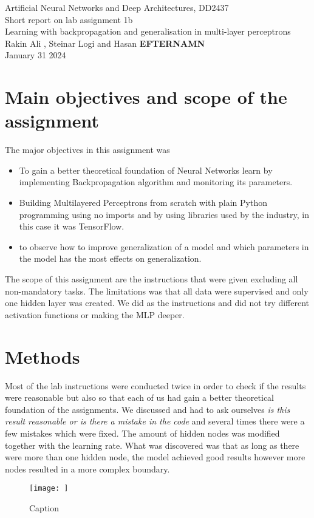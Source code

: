 \documentclass[a4paper]{article}
\begin{document}
\begin{center}
  {\large Artificial Neural Networks and Deep Architectures, DD2437}\\
  \vspace{7mm}
  {\huge Short report on lab assignment 1b\\[1ex]}
  {\Large Learning with backpropagation and generalisation in multi-layer perceptrons\\}
  \vspace{8mm}  
  {\Large Rakin Ali , Steinar Logi and Hasan \textbf{EFTERNAMN}\\}
  \vspace{4mm}
  {\large January 31 2024 }
\end{center}

\section{Main objectives and scope of the assignment}
The major objectives in this assignment was
\begin{itemize}
\item To gain a better theoretical foundation of Neural Networks learn by implementing Backpropagation algorithm and monitoring its parameters. 
\item Building Multilayered Perceptrons from scratch with plain Python programming using no imports and by using libraries used by the industry, in this case it was TensorFlow.
\item to observe how to improve generalization of a model and which parameters in the model has the most effects on generalization. 
\end{itemize}
The scope of this assignment are the instructions that were given excluding all non-mandatory tasks. The limitations was that all data were supervised and only one hidden layer was created. We did as the instructions and did not try different activation functions or making the MLP deeper. 
\section{Methods}
Most of the lab instructions were conducted twice in order to check if the results were reasonable but also so that each of us had gain a better theoretical foundation of the assignments. We discussed and had to ask ourselves \textit{is this result reasonable or is there a mistake in the code} and several times there were a few mistakes which were fixed. The amount of hidden nodes was modified together with the learning rate. What was discovered was that as long as there were more than one hidden node, the model achieved good results however more nodes resulted in a more complex boundary. 
\begin{figure}
    \centering
    \texttt{[image: ]}
    \caption{Caption}
    \label{fig:enter-label}
\end{figure}
\end{document}
